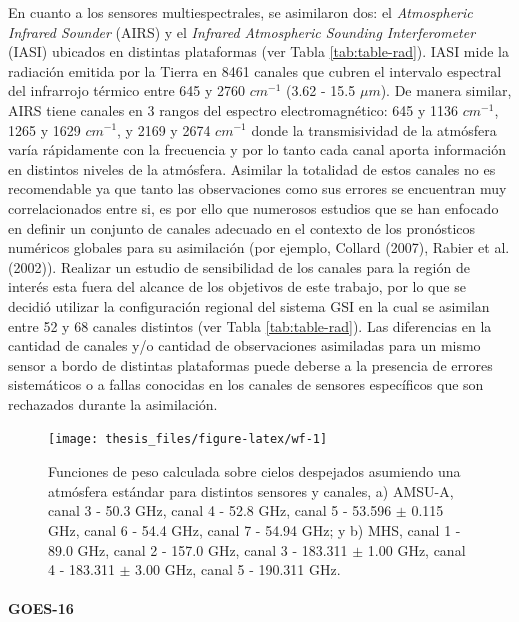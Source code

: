 \documentclass[12pt,oneside,a4paper]{reedthesis}
\begin{document}
En cuanto a los sensores multiespectrales, se asimilaron dos: el \emph{Atmospheric Infrared Sounder} (AIRS) y el \emph{Infrared Atmospheric Sounding Interferometer} (IASI) ubicados en distintas plataformas (ver Tabla \ref{tab:table-rad}). IASI mide la radiación emitida por la Tierra en 8461 canales que cubren el intervalo espectral del infrarrojo térmico entre 645 y 2760 \(cm^{-1}\) (3.62 - 15.5 \(\mu m\)). De manera similar, AIRS tiene canales en 3 rangos del espectro electromagnético: 645 y 1136 \(cm^{-1}\), 1265 y 1629 \(cm^{-1}\), y 2169 y 2674 \(cm^{-1}\) donde la transmisividad de la atmósfera varía rápidamente con la frecuencia y por lo tanto cada canal aporta información en distintos niveles de la atmósfera. Asimilar la totalidad de estos canales no es recomendable ya que tanto las observaciones como sus errores se encuentran muy correlacionados entre si, es por ello que numerosos estudios que se han enfocado en definir un conjunto de canales adecuado en el contexto de los pronósticos numéricos globales para su asimilación (por ejemplo, Collard (2007), Rabier et al. (2002)). Realizar un estudio de sensibilidad de los canales para la región de interés esta fuera del alcance de los objetivos de este trabajo, por lo que se decidió utilizar la configuración regional del sistema GSI en la cual se asimilan entre 52 y 68 canales distintos (ver Tabla \ref{tab:table-rad}). Las diferencias en la cantidad de canales y/o cantidad de observaciones asimiladas para un mismo sensor a bordo de distintas plataformas puede deberse a la presencia de errores sistemáticos o a fallas conocidas en los canales de sensores específicos que son rechazados durante la asimilación.


\begin{figure}

{\centering \texttt{[image: thesis\_files/figure-latex/wf-1]} 

}

\caption{Funciones de peso calculada sobre cielos despejados asumiendo una atmósfera estándar para distintos sensores y canales, a) AMSU-A, canal 3 - 50.3 GHz, canal 4 - 52.8 GHz, canal 5 - 53.596 \(\pm\) 0.115 GHz, canal 6 - 54.4 GHz, canal 7 - 54.94 GHz; y b) MHS, canal 1 - 89.0 GHz, canal 2 - 157.0 GHz, canal 3 - 183.311 \(\pm\) 1.00 GHz, canal 4 - 183.311 \(\pm\) 3.00 GHz, canal 5 - 190.311 GHz.}\label{fig:wf}
\end{figure}
\hypertarget{goes-16}{%
\paragraph{GOES-16}\label{goes-16}}
\end{document}
